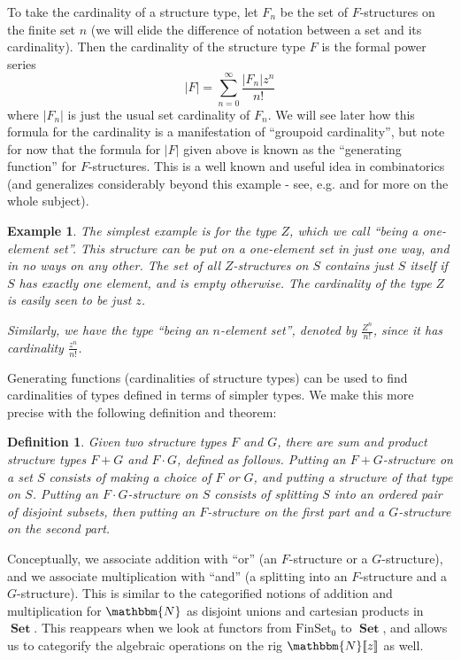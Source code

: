 \documentclass{amsart} \usepackage{amsmath,amssymb,bbm}
\newcommand{\opname}[1]{\operatorname{#1}}
\newtheorem{definition}{Definition}
\newcommand{\catname}[1]{\boldsymbol{\opname{{#1}}}}
\newcommand{\FSN}{\catname{FinSet_0}}
\newcommand{\Set}{\catname{Set}}
\newtheorem{varexample}{Example}
\newenvironment{example}{\begin{varexample}\em}{\em\end{varexample}}
\begin{document}
To take the cardinality of a structure type, let $F_n$ be the set of
$F$-structures on the finite set $n$ (we will elide the difference of
notation between a set and its cardinality).  Then the cardinality of
the structure type $F$ is the formal power series
\begin{equation}\label{eq:strtypecard}
 |F| = \sum_{n = 0}^{\infty} \frac{|F_n |z^n}{n!}
\end{equation} where $|F_n|$ is just the usual set cardinality of
$F_n$.  We will see later how this formula for the cardinality is a
manifestation of ``groupoid cardinality'', but note for now that the
formula for $|F|$ given above is known as the ``generating function''
for $F$-structures.  This is a well known and useful idea in
combinatorics (and generalizes considerably beyond this example - see,
e.g. \cite{wilf} and \cite{BLL} for more on the whole subject).

\begin{example} The simplest example is for the type $Z$, which we
call ``being a one-element set''.  This structure can be put on a
one-element set in just one way, and in no ways on any other.  The set
of all $Z$-structures on $S$ contains just $S$ itself if $S$ has
exactly one element, and is empty otherwise.  The cardinality of the
type $Z$ is easily seen to be just $z$.

Similarly, we have the type ``being an $n$-element set'', denoted by
$\frac{Z^n}{n!}$, since it has cardinality $\frac{z^n}{n!}$.
\end{example} 

Generating functions (cardinalities of structure types) can be used to
find cardinalities of types defined in terms of simpler types.  We
make this more precise with the following definition and theorem:

\begin{definition}
  Given two structure types $F$ and $G$, there are sum and product structure
  types $F + G$ and $F \cdot G$, defined as follows.  Putting an $F +
  G$-structure on a set $S$ consists of making a choice of $F$ or $G$, and
  putting a structure of that type on $S$.  Putting an $F \cdot G$-structure
  on $S$ consists of splitting $S$ into an ordered pair of disjoint subsets,
  then putting an $F$-structure on the first part and a $G$-structure on the
  second part.
\end{definition}

Conceptually, we associate addition with ``or'' (an $F$-structure or a
$G$-structure), and we associate multiplication with ``and'' (a
splitting into an $F$-structure and a $G$-structure).  This is similar
to the categorified notions of addition and multiplication for
$\mathbbm{N}$ as disjoint unions and cartesian products in $\Set$.
This reappears when we look at functors from $\FSN$ to $\Set$, and
allows us to categorify the algebraic operations on the rig
$\mathbbm{N}[\![z]\!]$ as well.
\end{document}
